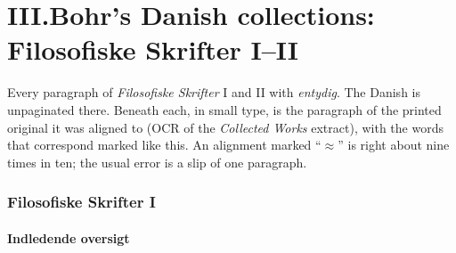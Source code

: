 \documentclass[11pt]{article}
\newcommand{\olg}[1]{{\setlength{\fboxsep}{0.8pt}\colorbox{cyan!25}{#1}}}
\begin{document}
\part*{III.\quad Bohr's Danish collections: Filosofiske Skrifter I--II}

\noindent Every paragraph of \emph{Filosofiske Skrifter} I and II with \emph{entydig}. The Danish is unpaginated there. Beneath each, in small type, is the paragraph of the printed original it was aligned to (OCR of the \emph{Collected Works} extract), with the words that correspond marked \olg{like this}. An alignment marked ``$\approx$'' is right about nine times in ten; the usual error is a slip of one paragraph.

\section{Filosofiske Skrifter I}

\subsection{Indledende oversigt}
\end{document}
